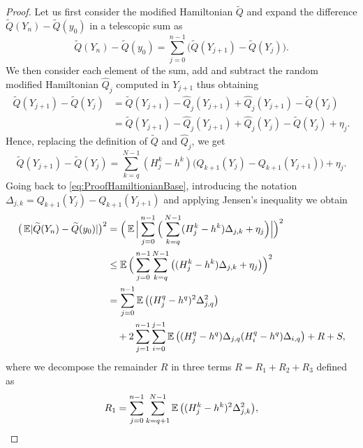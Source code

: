\documentclass[10pt]{article}
\begin{document}
\begin{proof} Let us first consider the modified Hamiltonian $\tilde Q$ and expand the difference $\tilde Q(Y_n) - \tilde Q(y_0)$ in a telescopic sum as
	\begin{equation}\label{eq:ProofHamiltionianBase}
		\tilde Q(Y_n) - \tilde Q(y_0) = \sum_{j=0}^{n-1} \big(\tilde Q(Y_{j+1}) - \tilde Q(Y_j)\big).
	\end{equation}
	We then consider each element of the sum, add and subtract the random modified Hamiltonian $\hat Q_j$ computed in $Y_{j+1}$ thus obtaining
	\begin{equation}
	\begin{aligned}
		\tilde Q(Y_{j+1}) - \tilde Q(Y_j) &= \tilde Q(Y_{j+1}) - \hat Q_j(Y_{j+1}) + \hat Q_j(Y_{j+1}) - \tilde Q(Y_j) \\
		&= \tilde Q(Y_{j+1}) - \hat Q_j(Y_{j+1}) + \hat Q_j(Y_j) - \tilde Q(Y_j) + \eta_j.
	\end{aligned}
	\end{equation}
	Hence, replacing the definition of $\tilde Q$ and $\hat Q_j$, we get
	\begin{equation}
		\tilde Q(Y_{j+1}) - \tilde Q(Y_j) = \sum_{k=q}^{N-1} (H_j^k - h^k)\big(Q_{k+1}(Y_j) - Q_{k+1}(Y_{j+1})\big) + \eta_j.
	\end{equation}
	Going back to \eqref{eq:ProofHamiltionianBase}, introducing the notation $\Delta_{j,k} = Q_{k+1}(Y_j) - Q_{k+1}(Y_{j+1})$ and applying Jensen's inequality we obtain	\begin{equation}\label{eq:ProofHamiltonianDecomp}
	\begin{aligned}
		\big(\operatorname{\mathbb{E}} \lvert\widetilde Q(Y_n) - \widetilde Q(y_0)\rvert\big)^2 &= \Big(\operatorname{\mathbb{E}} \Big\lvert\sum_{j=0}^{n-1} \Big(\sum_{k=q}^{N-1} (H_j^k - h^k)\Delta_{j,k} + \eta_j \Big) \Big\rvert\Big)^2 \\
		&\leq \operatorname{\mathbb{E}} \Big(\sum_{j=0}^{n-1}\sum_{k=q}^{N-1} \big( (H_j^k - h^k)\Delta_{j,k} + \eta_j \big) \Big)^2 \\
		&= \sum_{j=0}^{n-1}\operatorname{\mathbb{E}}\big((H_j^q - h^q)^2 \Delta_{j,q}^2\big) \\
		&\quad + 2\sum_{j=1}^{n-1}\sum_{i=0}^{j-1} \operatorname{\mathbb{E}}\big((H_j^q - h^q)\Delta_{j,q}(H_i^q - h^q) \Delta_{i,q}\big) + R + S,
	\end{aligned}
	\end{equation}
	where we decompose the remainder $R$ in three terms $R = R_1 + R_2 + R_3$ defined as
	\begin{equation}
	\begin{aligned}
		R_1 &= \sum_{j=0}^{n-1}\sum_{k=q+1}^{N-1} \E\big((H_j^k - h^k)^2 \Delta_{j,k}^2\big), \\

\end{aligned}
\end{equation}
\end{proof}
\end{document}
